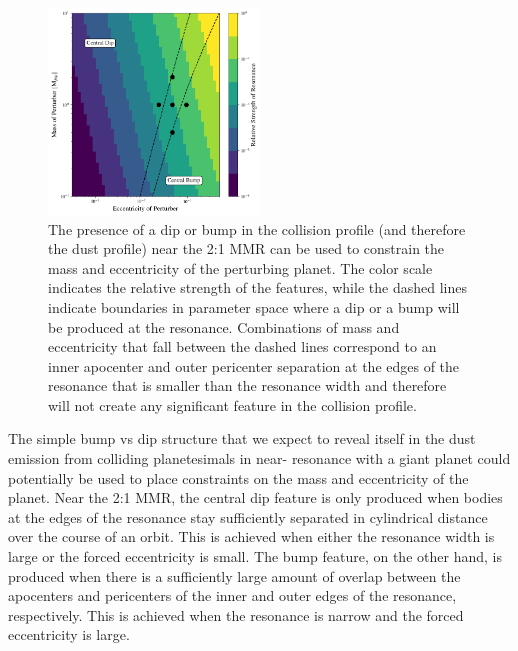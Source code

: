 \begin{figure}
\begin{center}
    \includegraphics[width=0.5\textwidth]{figures/grind/bump_dip_diag.png}
    \caption{The presence of a dip or bump in the collision profile (and therefore the dust profile) near the 2:1 MMR can be used 
    to constrain the mass and eccentricity of the perturbing planet. The color scale indicates the relative strength of the features, 
    while the dashed lines indicate boundaries in parameter space where a dip or a bump will be produced at the resonance. 
    Combinations of mass and eccentricity that fall between the dashed lines correspond to an inner apocenter and outer 
    pericenter separation at the edges of the resonance that is smaller than the resonance width and therefore will not create any 
    significant feature in the collision profile.\label{fig:bump_dip_diag}}
\end{center}
\end{figure}

The simple bump vs dip structure that we expect to reveal itself in the dust emission from colliding planetesimals in near-
resonance with a giant planet could potentially be used to place constraints on the mass and eccentricity of the planet. Near the 
2:1 MMR, the central dip feature is only produced when bodies at the edges of the resonance stay sufficiently separated in 
cylindrical distance over the course of an orbit. This is achieved when either the resonance width is large or the forced 
eccentricity is small. The bump feature, on the other hand, is produced when there is a sufficiently large amount of overlap 
between the apocenters and pericenters of the inner and outer edges of the resonance, respectively. This is achieved when the 
resonance is narrow and the forced eccentricity is large.

